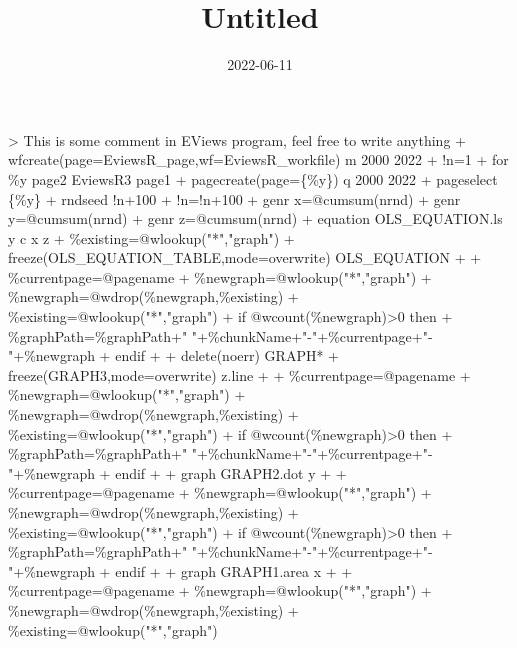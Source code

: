 \documentclass[
]{article}
\title{Untitled}
\author{}
\date{\vspace{-2.5em}2022-06-11}
\newenvironment{Shaded}{\begin{snugshade}}{\end{snugshade}}
\newcommand{\NormalTok}[1]{#1}
\begin{document}
\maketitle

{
\setcounter{tocdepth}{2}
\tableofcontents
}
\begin{Shaded}
\begin{Highlighting}[]
\NormalTok{\textgreater{} \textquotesingle{}This is some comment in EViews program, feel free to write anything}
\NormalTok{+ wfcreate(page=EviewsR\_page,wf=EviewsR\_workfile) m 2000 2022}
\NormalTok{+ !n=1}
\NormalTok{+ for \%y  page2 EviewsR3 page1 }
\NormalTok{+ pagecreate(page=\{\%y\}) q 2000 2022}
\NormalTok{+ pageselect \{\%y\}}
\NormalTok{+ rndseed !n+100}
\NormalTok{+ !n=!n+100}
\NormalTok{+ genr x=@cumsum(nrnd)}
\NormalTok{+ genr y=@cumsum(nrnd)}
\NormalTok{+ genr z=@cumsum(nrnd)}
\NormalTok{+ equation OLS\_EQUATION.ls y c x z}
\NormalTok{+ \%existing=@wlookup("*","graph")}
\NormalTok{+ freeze(OLS\_EQUATION\_TABLE,mode=overwrite) OLS\_EQUATION}
\NormalTok{+ }
\NormalTok{+   \%currentpage=@pagename}
\NormalTok{+   \%newgraph=@wlookup("*","graph")}
\NormalTok{+   \%newgraph=@wdrop(\%newgraph,\%existing)}
\NormalTok{+   \%existing=@wlookup("*","graph")}
\NormalTok{+   if @wcount(\%newgraph)\textgreater{}0 then}
\NormalTok{+   \%graphPath=\%graphPath+" "+\%chunkName+"{-}"+\%currentpage+"{-}"+\%newgraph}
\NormalTok{+   endif}
\NormalTok{+  }
\NormalTok{+ delete(noerr) GRAPH*}
\NormalTok{+ freeze(GRAPH3,mode=overwrite) z.line}
\NormalTok{+ }
\NormalTok{+   \%currentpage=@pagename}
\NormalTok{+   \%newgraph=@wlookup("*","graph")}
\NormalTok{+   \%newgraph=@wdrop(\%newgraph,\%existing)}
\NormalTok{+   \%existing=@wlookup("*","graph")}
\NormalTok{+   if @wcount(\%newgraph)\textgreater{}0 then}
\NormalTok{+   \%graphPath=\%graphPath+" "+\%chunkName+"{-}"+\%currentpage+"{-}"+\%newgraph}
\NormalTok{+   endif}
\NormalTok{+  }
\NormalTok{+ graph GRAPH2.dot y}
\NormalTok{+ }
\NormalTok{+   \%currentpage=@pagename}
\NormalTok{+   \%newgraph=@wlookup("*","graph")}
\NormalTok{+   \%newgraph=@wdrop(\%newgraph,\%existing)}
\NormalTok{+   \%existing=@wlookup("*","graph")}
\NormalTok{+   if @wcount(\%newgraph)\textgreater{}0 then}
\NormalTok{+   \%graphPath=\%graphPath+" "+\%chunkName+"{-}"+\%currentpage+"{-}"+\%newgraph}
\NormalTok{+   endif}
\NormalTok{+  }
\NormalTok{+ graph GRAPH1.area x}
\NormalTok{+ }
\NormalTok{+   \%currentpage=@pagename}
\NormalTok{+   \%newgraph=@wlookup("*","graph")}
\NormalTok{+   \%newgraph=@wdrop(\%newgraph,\%existing)}
\NormalTok{+   \%existing=@wlookup("*","graph")}

\end{Highlighting}
\end{Shaded}
\end{document}
